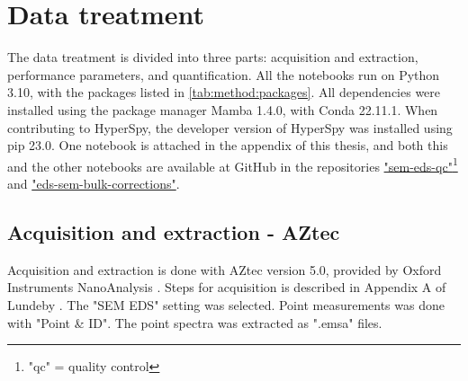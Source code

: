 






















\clearpage

\section{Data treatment}
\label{method:data_treatment}

The data treatment is divided into three parts: acquisition and extraction, performance parameters, and quantification.
All the notebooks run on Python 3.10, with the packages listed in \cref{tab:method:packages}.
All dependencies were installed using the package manager Mamba 1.4.0, with Conda 22.11.1.
When contributing to HyperSpy, the developer version of HyperSpy was installed using pip 23.0.
One notebook is attached in the appendix of this thesis, and both this and the other notebooks are available at GitHub in the repositories \href{https://github.com/brynjarmorka/sem-eds-qc}{"sem-eds-qc"}\footnote{"qc" = quality control} and \href{https://github.com/brynjarmorka/eds-sem-bulk-corrections}{"eds-sem-bulk-corrections"}. 




\subsection{Acquisition and extraction - AZtec}
\label{method:data_treatment:aztec}

Acquisition and extraction is done with AZtec version 5.0, provided by Oxford Instruments NanoAnalysis \cite{aztec_manual}.
Steps for acquisition is described in Appendix A of Lundeby \cite{lundeby_improving_2019}.
The "SEM EDS" setting was selected.
Point measurements was done with "Point \& ID".
The point spectra was extracted as ".emsa" files.

